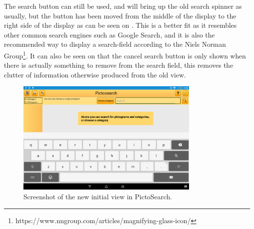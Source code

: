 The search button can still be used, and will bring up the old search spinner as usually, but the button has been moved from the middle of the display to the right side of the display as can be seen on .
This is a better fit as it resembles other common search engines such as Google Search, and it is also the recommended way to display a search-field according to the Niels Norman Group\footnote{https://www.nngroup.com/articles/magnifying-glass-icon/}.
It can also be seen on  that the cancel search button is only shown when there is actually something to remove from the search field, this removes the clutter of information otherwise produced from the old view.

\begin{figure}[h]
    \centering
    \includegraphics[width=0.8\textwidth]{figures/img/screenshots/new_startup.png}
    \caption{Screenshot of the new initial view in PictoSearch.}\label{fig:screenshot_newstartup}
\end{figure}

